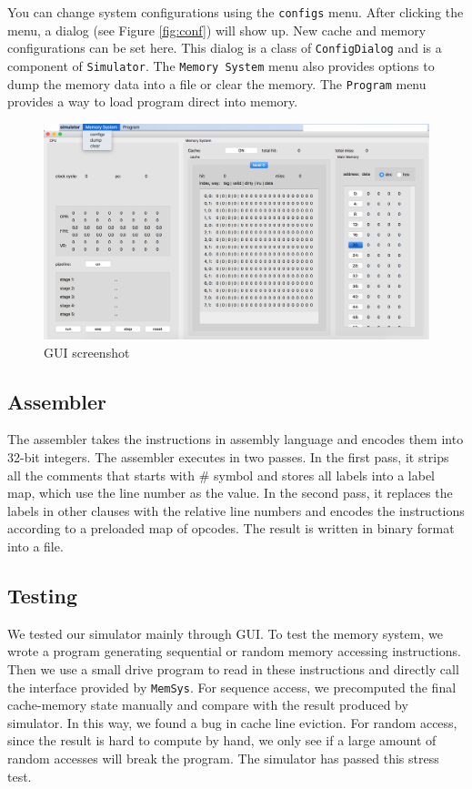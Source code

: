 \documentclass{sig-alternate}
\begin{document}
You can change system configurations using the \texttt{configs} menu. After clicking the menu, a dialog (see Figure \ref{fig:conf}) will show up. New cache and memory configurations can be set here. This dialog is a class of \texttt{ConfigDialog} and is a component of \texttt{Simulator}. The \texttt{Memory System} menu also provides options to dump the memory data into a file or clear the memory. The \texttt{Program} menu provides a way to load program direct into memory. 

\begin{figure}[!ht]
\centering
\includegraphics[width = 0.7\linewidth,keepaspectratio]{gui}
\caption{GUI screenshot}
\label{fig:gui}
\end{figure}

\subsection{Assembler }
The assembler takes the instructions in assembly language and encodes them into 32-bit integers. The assembler executes in two passes. In the first pass, it strips all the comments that starts with $\#$ symbol and stores all labels into a label map, which use the line number as the value. In the second pass, it replaces the labels in other clauses with the relative line numbers and encodes the instructions according to a preloaded map of opcodes. The result is written in binary format into a file. 


\subsection{Testing}
We tested our simulator mainly through GUI. To test the memory system, we wrote a program generating sequential or random memory accessing instructions. Then we use a small drive program to read in these instructions and directly call the interface provided by \texttt{MemSys}. For sequence access, we precomputed the final cache-memory state manually and compare with the result produced by simulator. In this way, we found a bug in cache line eviction. For random access, since the result is hard to compute by hand, we only see if a large amount of random accesses will break the program. The simulator has passed this stress test.
\end{document}
